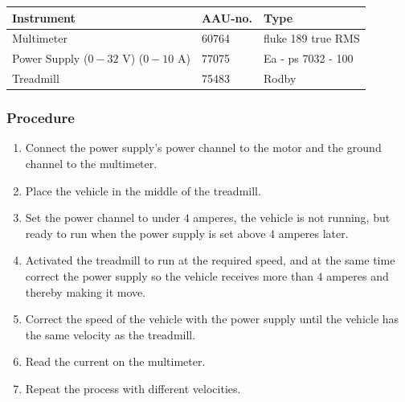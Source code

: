 \begin{table}[H]
\begin{tabular}{|l|l|p{4cm}|}
\hline%
  \textbf{Instrument}                        &  \textbf{AAU-no.}  &  \textbf{Type}       \\
\hline%
  Multimeter                               &  60764             &  fluke 189 true RMS    \\
\hline%
  Power Supply ($0 - 32$ V) ($0 - 10$ A)     &  77075             &  Ea - ps 7032 - 100  \\
\hline%
  Treadmill                         &  75483             &  Rodby            \\
\hline%
\end{tabular}
\end{table}

\subsubsection{Procedure}

\begin{enumerate}
  \item Connect the power supply's power channel to the motor and the ground channel to the multimeter.
  \item Place the vehicle in the middle of the treadmill.
  \item Set the power channel to under $4$ amperes, the vehicle is not running, but ready to run when the power supply is set above $4$ amperes later. 
  \item Activated the treadmill to run at the required speed, and at the same time correct the power supply so the vehicle receives more than $4$ amperes and thereby making it move.
  \item Correct the speed of the vehicle with the power supply until the vehicle has the same velocity as the treadmill.
  \item Read the current on the multimeter.
  \item Repeat the process with different velocities.
\end{enumerate}

